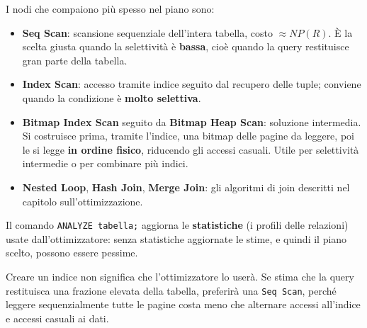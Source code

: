 \documentclass[a4paper,twoside]{article}
\begin{document}
\noindent
I nodi che compaiono più spesso nel piano sono:
\begin{itemize}
  \item \textbf{Seq Scan}: scansione sequenziale dell'intera tabella, costo
    \( \approx NP(R) \). È la scelta giusta quando la selettività è \textbf{bassa},
    cioè quando la query restituisce gran parte della tabella.

  \item \textbf{Index Scan}: accesso tramite indice seguito dal recupero delle tuple;
    conviene quando la condizione è \textbf{molto selettiva}.

  \item \textbf{Bitmap Index Scan} seguito da \textbf{Bitmap Heap Scan}: soluzione
    intermedia. Si costruisce prima, tramite l'indice, una bitmap delle pagine da
    leggere, poi le si legge \textbf{in ordine fisico}, riducendo gli accessi casuali.
    Utile per selettività intermedie o per combinare più indici.

  \item \textbf{Nested Loop}, \textbf{Hash Join}, \textbf{Merge Join}: gli algoritmi di
    join descritti nel capitolo sull'ottimizzazione.
\end{itemize}

\noindent
Il comando \texttt{ANALYZE tabella;} aggiorna le \textbf{statistiche} (i profili delle
relazioni) usate dall'ottimizzatore: senza statistiche aggiornate le stime, e quindi il
piano scelto, possono essere pessime.

\begin{define}
  Creare un indice non significa che l'ottimizzatore lo userà. Se stima che la query
  restituisca una frazione elevata della tabella, preferirà una \texttt{Seq Scan},
  perché leggere sequenzialmente tutte le pagine costa meno che alternare accessi
  all'indice e accessi casuali ai dati.
\end{define}
\end{document}
